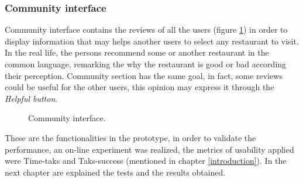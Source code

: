 \subsubsection{Community interface}
Community interface contains the reviews of all the users (figure
\ref{fig:community}) in order to display information that may helps 
another users to select any restaurant to visit. In the real life, the 
persons recommend some or another restaurant in the common 
language, remarking the why the restaurant is good or bad according 
their perception. Community section has the same goal, in fact, 
some reviews could be useful for the other users, this opinion may 
express it through the \textit{Helpful button}.
\begin{figure}
\captionsetup{font=footnotesize}
\centering
{}
\caption{Community interface.}
\label{fig:community}   
\end{figure}

These are the functionalities in the prototype, in order to validate
the performance, an on-line experiment was realized, the metrics 
of usability applied were Time-taks and Taks-success (mentioned 
in chapter  \ref{introduction}). In the next chapter are 
explained the tests  and the results obtained.







